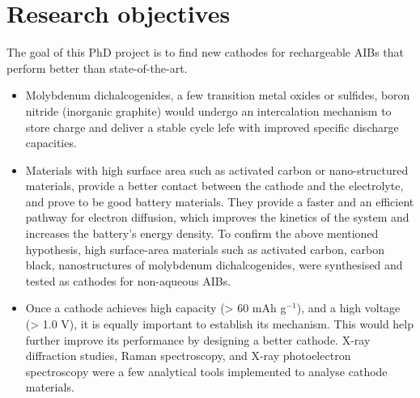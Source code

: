\section{Research objectives}
The goal of this PhD project is to find new cathodes for rechargeable AIBs that perform better than state-of-the-art. 
\begin{itemize}
    \item Molybdenum dichalcogenides, a few transition metal oxides or sulfides, boron nitride (inorganic graphite) would undergo an intercalation mechanism to store charge and deliver a stable cycle lefe with improved specific discharge capacities. 
    
    \item Materials with high surface area such as activated carbon or nano-structured materials, provide a better contact between the cathode and the electrolyte, and prove to be good battery materials. They provide a faster and an efficient pathway for electron diffusion, which improves the kinetics of the system and increases the battery's energy density. To confirm the above mentioned hypothesis, high surface-area materials such as activated carbon, carbon black, nanostructures of molybdenum dichalcogenides, were synthesised and tested as cathodes for non-aqueous AIBs.
    
    \item Once a cathode achieves high capacity (> 60 mAh g$^{-1}$), and a high voltage (> 1.0 V), it is equally important to establish its mechanism. This would help further improve its performance by designing a better cathode. X-ray diffraction studies, Raman spectroscopy, and X-ray photoelectron spectroscopy were a few analytical tools implemented to analyse cathode materials. 

\end{itemize}






